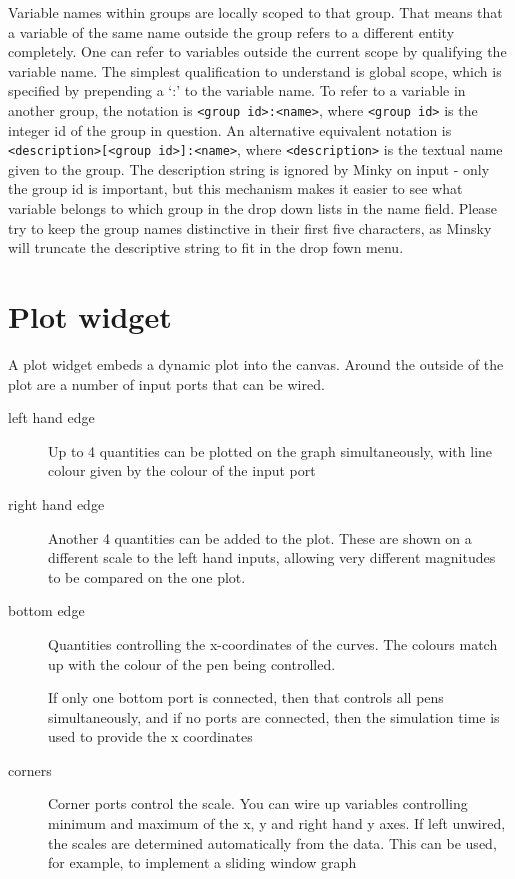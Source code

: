 Variable names within groups are locally scoped to that group. That
means that a variable of the same name outside the group refers to a
different entity completely. One can refer to variables outside the
current scope by qualifying the variable name. The simplest
qualification to understand is global scope, which is specified by
prepending a `:' to the variable name. To refer to a variable in
another group, the notation is \verb+<group id>:<name>+, where
\verb+<group id>+ is the integer id of the group in question. An
alternative equivalent notation is \verb+<description>[<group id>]:<name>+, where \verb+<description>+ is the textual name given to
the group. The description string is ignored by Minky on input - only
the group id is important, but this mechanism makes it easier to see
what variable belongs to which group in the drop down lists in the
name field. Please try to keep the group names distinctive in their
first five characters, as Minsky will truncate the descriptive string
to fit in the drop fown menu.

\section{Plot widget}
\label{Plot}

A plot widget embeds a dynamic plot into the canvas. Around the
outside of the plot are a number of input ports that can be wired.


\begin{description}
\item[left hand edge] Up to 4 quantities can be plotted on the graph
  simultaneously, with line colour given by the colour of the input
  port
\item[right hand edge] Another 4 quantities can be added to the
  plot. These are shown on a different scale to the left hand inputs,
  allowing very different magnitudes to be compared on the one plot.
\item[bottom edge] Quantities controlling the x-coordinates of the
  curves. The colours match up with the colour of the pen being
  controlled.


  If only one bottom port is connected, then that controls all pens
  simultaneously, and if no ports are connected, then the simulation
  time is used to provide the x coordinates
\item[corners] Corner ports control the scale. You can wire up
  variables controlling minimum and maximum of the x, y and right hand
  y axes. If left unwired, the scales are determined automatically
  from the data. This can be used, for example, to implement a sliding
  window graph

\end{description}

